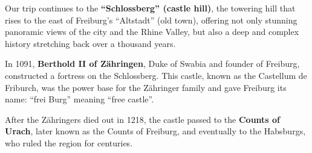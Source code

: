 \documentclass[landscape, a4paper]{article}
\newcommand\alert[1]{\textcolor{PrimaryColor}{\textbf{#1}}}
\begin{document}
\begin{minipage}[t]{0.31\textwidth}
{		Our trip continues to the \alert{\enquote{Schlossberg} (castle hill)}, the towering hill that rises to the east of Freiburg’s \enquote{Altstadt} (old town), offering not only stunning panoramic views of the city and the Rhine Valley, but also a deep and complex history stretching back over a thousand years.

		In 1091, \alert{Berthold II of Zähringen}, Duke of Swabia and founder of Freiburg, constructed a fortress on the Schlossberg. This castle, known as the Castellum de Friburch, was the power base for the Zähringer family and gave Freiburg its name: \enquote{frei Burg} meaning \enquote{free castle}.

		After the Zähringers died out in 1218, the castle passed to the \alert{Counts of Urach}, later known as the Counts of Freiburg, and eventually to the Habsburgs, who ruled the region for centuries.
	}{
	}
\end{minipage}%
\hfill%
\vrule width 0.01cm
\hfill%
\end{document}
